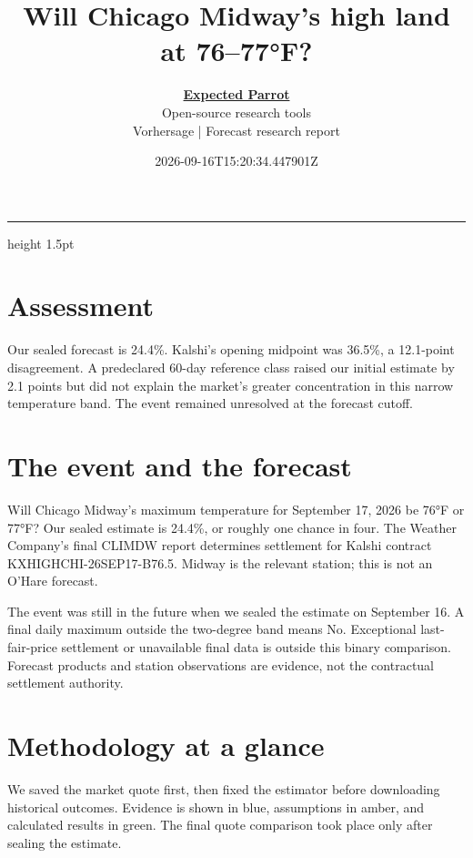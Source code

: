 \documentclass[11pt]{article}
\title{Will Chicago Midway’s high land at 76–77°F?}
\author{\href{https://www.expectedparrot.com/}{\textcolor{epgreen}{\textbf{Expected Parrot}}}\\{\small Open-source research tools}\\[4pt]{\small Vorhersage | Forecast research report}}
\date{2026-09-16T15:20:34.447901Z}
\begin{document}
\maketitle
{\color{epgreen}\hrule height 1.5pt}\vspace{8pt}
\section*{\textcolor{epdarkgreen}{Assessment}}
Our sealed forecast is 24.4\%. Kalshi’s opening midpoint was 36.5\%, a 12.1-point disagreement. A predeclared 60-day reference class raised our initial estimate by 2.1 points but did not explain the market’s greater concentration in this narrow temperature band. The event remained unresolved at the forecast cutoff.


\section*{\textcolor{epdarkgreen}{The event and the forecast}}
Will Chicago Midway’s maximum temperature for September 17, 2026 be 76°F or 77°F? Our sealed estimate is 24.4\%, or roughly one chance in four. The Weather Company’s final CLIMDW report determines settlement for Kalshi contract KXHIGHCHI-26SEP17-B76.5. Midway is the relevant station; this is not an O’Hare forecast.


The event was still in the future when we sealed the estimate on September 16. A final daily maximum outside the two-degree band means No. Exceptional last-fair-price settlement or unavailable final data is outside this binary comparison. Forecast products and station observations are evidence, not the contractual settlement authority.


\clearpage
\section*{\textcolor{epdarkgreen}{Methodology at a glance}}
We saved the market quote first, then fixed the estimator before downloading historical outcomes. Evidence is shown in blue, assumptions in amber, and calculated results in green. The final quote comparison took place only after sealing the estimate.
\end{document}
